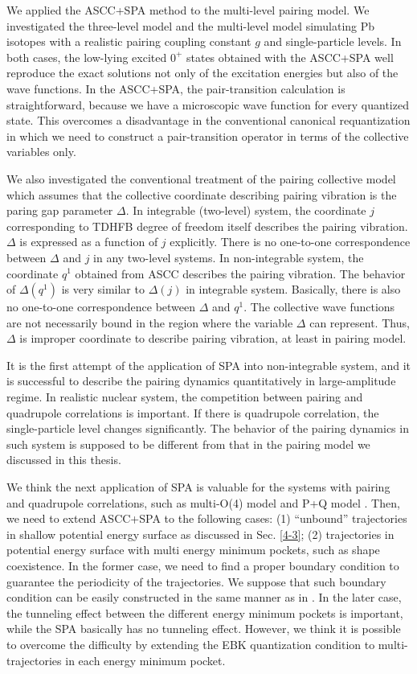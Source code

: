 \documentclass[11pt]{book} %
\begin{document}
We applied the ASCC+SPA method to the multi-level pairing model.
We investigated the three-level model and 
the multi-level model simulating Pb isotopes
with a realistic pairing coupling constant $g$ and single-particle levels.
In both cases, the low-lying excited $0^+$ states obtained with
the ASCC+SPA well reproduce the exact solutions
not only of the excitation energies but also of the wave functions.
In the ASCC+SPA, the pair-transition calculation is straightforward,
because we have a microscopic wave function for every quantized state.
This overcomes a disadvantage in the conventional canonical requantization
in which we need to construct a pair-transition operator
in terms of the collective variables only.

We also investigated the conventional treatment of the pairing
collective model which assumes that the collective coordinate
describing pairing vibration is the paring gap parameter $\Delta$.
In integrable (two-level) system, the coordinate $j$ corresponding to TDHFB degree of freedom itself describes the pairing vibration. $\Delta$ is expressed as a function of $j$ explicitly.
There is no
one-to-one correspondence between $\Delta$ and $j$ in any two-level systems.
In non-integrable system, the coordinate $q^1$ obtained from ASCC describes the pairing vibration. The behavior of $\Delta(q^1)$ is very similar to $\Delta(j)$ in integrable system. Basically, there is also no
one-to-one correspondence between $\Delta$ and $q^1$.
The collective
wave functions are not necessarily bound in the region where
the variable $\Delta$ can represent.
Thus, $\Delta$ is improper coordinate to describe pairing vibration, at least in pairing model.

It is the first attempt of the application of SPA into non-integrable system, and it is successful to describe the pairing dynamics quantitatively in large-amplitude regime. 
In realistic nuclear system, the competition between pairing and quadrupole correlations is important. If there is quadrupole correlation, the single-particle level changes significantly. The behavior of the pairing dynamics in such system is supposed to be different from that in the pairing model we discussed in this thesis.

We think the next application of SPA is valuable for the systems with pairing and quadrupole correlations, such as multi-O(4) model \cite{HNMM07} and P+Q model \cite{HNMM08}. Then, we need to extend ASCC+SPA to the following cases: (1) ``unbound'' trajectories in shallow potential energy surface as discussed in Sec. \ref{4-3}; (2) trajectories in potential energy surface with multi energy minimum pockets, such as shape coexistence.
In the former case, we need to find a proper boundary condition to guarantee the periodicity  of the trajectories. We suppose that such boundary condition can be easily constructed in the same manner as in \cite{HNMM07,HNMM08}. In the later case, the tunneling effect between the different energy minimum pockets is important, while the SPA basically has no tunneling effect. However, we think it is possible to overcome the difficulty by extending the EBK quantization condition to multi-trajectories in each energy minimum pocket.
\end{document}
